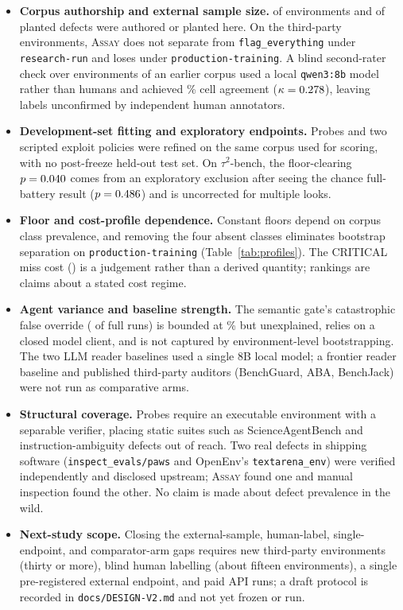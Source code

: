\documentclass[11pt]{article}
\newcommand{\assay}{\textsc{Assay}}
\newcommand{\fe}{\texttt{flag\_everything}}
\begin{document}
\begin{itemize}\setlength\itemsep{1pt}\setlength\parskip{0pt}
\item \textbf{Corpus authorship and external sample size.} \nSelfAuthored{} of \nEnv{} environments
and \nPlantedHere{} of \nPlanted{} planted defects were authored or planted here. On the
\nExternal{} third-party environments, \assay{} does not separate from \fe{} under
\texttt{research-run} and loses under \texttt{production-training}. A blind second-rater check over
\kappaEnvs{} environments of an earlier corpus used a local \texttt{qwen3:8b} model rather than
humans and achieved \kappaAgree{}\% cell agreement ($\kappa=0.278{}$), leaving labels
unconfirmed by independent human annotators.
\item \textbf{Development-set fitting and exploratory endpoints.} Probes and two scripted exploit
policies were refined on the same corpus used for scoring, with no post-freeze held-out test set.
On $\tau^2$-bench, the floor-clearing $p=0.040{}$ comes from an exploratory exclusion after
seeing the chance full-battery result ($p=0.486{}$) and is uncorrected for multiple looks.
\item \textbf{Floor and cost-profile dependence.} Constant floors depend on corpus class prevalence,
and removing the four absent classes eliminates bootstrap separation on
\texttt{production-training} (Table~\ref{tab:profiles}). The CRITICAL miss cost (\critShipped{}) is
a judgement rather than a derived quantity; rankings are claims about a stated cost regime.
\item \textbf{Agent variance and baseline strength.} The semantic gate's catastrophic false override
(\gateBadRuns{} of \gateRuns{} full runs) is bounded at \foUpper{}\% but unexplained, relies on a
closed model client, and is not captured by environment-level bootstrapping. The two LLM reader
baselines used a single 8B local model; a frontier reader baseline and published third-party
auditors (BenchGuard, ABA, BenchJack) were not run as comparative arms.
\item \textbf{Structural coverage.} Probes require an executable environment with a separable
verifier, placing static suites such as ScienceAgentBench and instruction-ambiguity defects out of
reach. Two real defects in shipping software (\texttt{inspect\_evals/paws} and OpenEnv's
\texttt{textarena\_env}) were verified independently and disclosed upstream; \assay{} found one and
manual inspection found the other. No claim is made about defect prevalence in the wild.
\item \textbf{Next-study scope.} Closing the external-sample, human-label, single-endpoint, and
comparator-arm gaps requires new third-party environments (thirty or more), blind human labelling
(about fifteen environments), a single pre-registered external endpoint, and paid API runs; a draft
protocol is recorded in \texttt{docs/DESIGN-V2.md} and not yet frozen or run.
\end{itemize}
\end{document}
